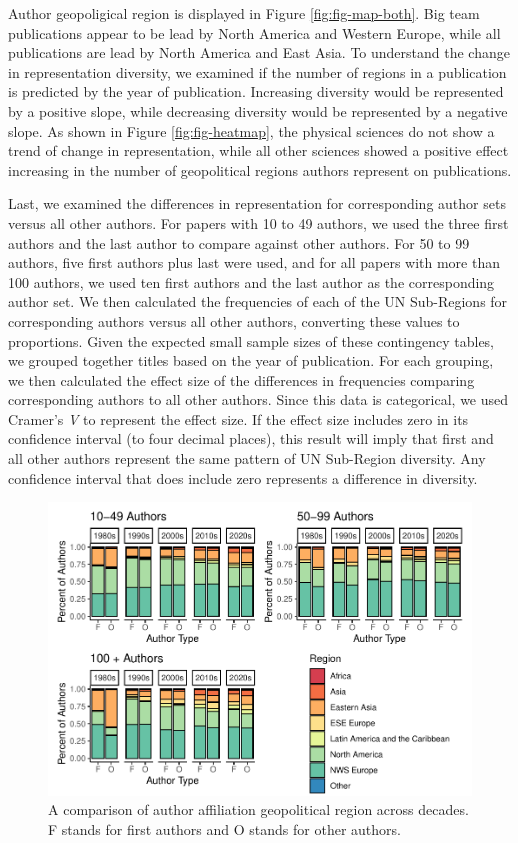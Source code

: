 \documentclass[
  man,floatsintext]{apa6}
\begin{document}
Author geopoligical region is displayed in Figure \ref{fig:fig-map-both}. Big team publications appear to be lead by North America and Western Europe, while all publications are lead by North America and East Asia. To understand the change in representation diversity, we examined if the number of regions in a publication is predicted by the year of publication. Increasing diversity would be represented by a positive slope, while decreasing diversity would be represented by a negative slope. As shown in Figure \ref{fig:fig-heatmap}, the physical sciences do not show a trend of change in representation, while all other sciences showed a positive effect increasing in the number of geopolitical regions authors represent on publications.

Last, we examined the differences in representation for corresponding author sets versus all other authors. For papers with 10 to 49 authors, we used the three first authors and the last author to compare against other authors. For 50 to 99 authors, five first authors plus last were used, and for all papers with more than 100 authors, we used ten first authors and the last author as the corresponding author set. We then calculated the frequencies of each of the UN Sub-Regions for corresponding authors versus all other authors, converting these values to proportions. Given the expected small sample sizes of these contingency tables, we grouped together titles based on the year of publication. For each grouping, we then calculated the effect size of the differences in frequencies comparing corresponding authors to all other authors. Since this data is categorical, we used Cramer's \emph{V} to represent the effect size. If the effect size includes zero in its confidence interval (to four decimal places), this result will imply that first and all other authors represent the same pattern of UN Sub-Region diversity. Any confidence interval that does include zero represents a difference in diversity.

\begin{figure}
\centering
\includegraphics{manuscript_scopus_files/figure-latex/fig-author-gpe-1.pdf}
\caption{\label{fig:fig-author-gpe}A comparison of author affiliation geopolitical region across decades. F stands for first authors and O stands for other authors.}
\end{figure}
\end{document}
